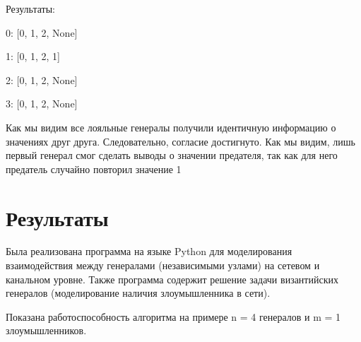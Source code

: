 \documentclass[a4paper,12pt]{article}
\begin{document}
Результаты:

0: [0, 1, 2, None]

1: [0, 1, 2, 1]

2: [0, 1, 2, None]

3: [0, 1, 2, None]

Как мы видим все лояльные генералы получили идентичную информацию о
значениях друг друга. Следовательно, согласие достигнуто. Как мы видим, лишь первый
генерал смог сделать выводы о значении предателя, так как для него предатель случайно
повторил значение 1

\section{Результаты}

Была реализована программа на языке Python для моделирования взаимодействия
между генералами (независимыми узлами) на сетевом и канальном уровне. Также
программа содержит решение задачи византийских генералов (моделирование наличия
злоумышленника в сети).

Показана работоспособность алгоритма на примере n = 4 генералов и m = 1
злоумышленников.
\end{document}
